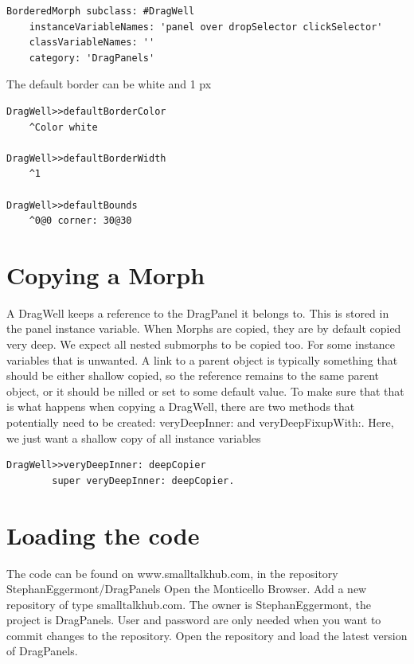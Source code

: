 \documentclass[10pt, twoside]{article}   	%
\begin{document}
\begin{verbatim}
BorderedMorph subclass: #DragWell
    instanceVariableNames: 'panel over dropSelector clickSelector'
    classVariableNames: ''
    category: 'DragPanels'
\end{verbatim} 
The default border can be white and 1 px
\begin{verbatim}
DragWell>>defaultBorderColor
    ^Color white

DragWell>>defaultBorderWidth
    ^1

DragWell>>defaultBounds
    ^0@0 corner: 30@30
\end{verbatim}

\section{Copying a Morph}

A DragWell keeps a reference to the DragPanel it belongs to. This is stored 
in the panel instance variable. When Morphs are copied, they are by default copied very deep.
We expect all nested submorphs to be copied too. For some instance variables that is unwanted.
A link to a parent object is typically something that should be either shallow copied, so the reference 
remains to the same parent object, or it should be nilled or set to some default value. To make sure 
that that is what happens when copying a DragWell, there are two methods that potentially need 
to be created: veryDeepInner: and veryDeepFixupWith:. Here, we just want a shallow copy of 
all instance variables

\begin{verbatim}
DragWell>>veryDeepInner: deepCopier
        super veryDeepInner: deepCopier.
\end{verbatim}	

\section{Loading the code}
The code can be found on www.smalltalkhub.com, in the repository StephanEggermont/DragPanels
Open the Monticello Browser. Add a new repository of type smalltalkhub.com. 
The owner is StephanEggermont, the project is DragPanels. User and password are only needed
when you want to commit changes to the repository. Open the repository and load the latest version of
DragPanels.
\end{document}
